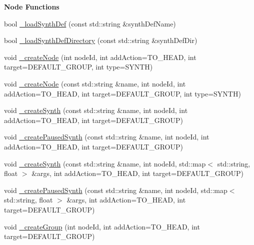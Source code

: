 \begin{Indent}{\bf Node Functions}\par
\begin{DoxyCompactItemize}
\item 
bool \hyperlink{classColliderPlusPlus_1_1Client__Server_ad95270fb115d2fbad727f32130388adf}{\-\_\-load\-Synth\-Def} (const std\-::string \&synth\-Def\-Name)
\item 
bool \hyperlink{classColliderPlusPlus_1_1Client__Server_aba8d4f99041d1b47e1571039c8df7327}{\-\_\-load\-Synth\-Def\-Directory} (const std\-::string \&synth\-Def\-Dir)
\item 
void \hyperlink{classColliderPlusPlus_1_1Client__Server_a8112bffd21ce3d850fc8e1003d58f6d9}{\-\_\-create\-Node} (int node\-Id, int add\-Action=T\-O\-\_\-\-H\-E\-A\-D, int target=D\-E\-F\-A\-U\-L\-T\-\_\-\-G\-R\-O\-U\-P, int type=S\-Y\-N\-T\-H)
\item 
void \hyperlink{classColliderPlusPlus_1_1Client__Server_a6924420f2e0adcfbccdd41c8e8d84ef2}{\-\_\-create\-Node} (const std\-::string \&name, int node\-Id, int add\-Action=T\-O\-\_\-\-H\-E\-A\-D, int target=D\-E\-F\-A\-U\-L\-T\-\_\-\-G\-R\-O\-U\-P, int type=S\-Y\-N\-T\-H)
\item 
void \hyperlink{classColliderPlusPlus_1_1Client__Server_a0ad9d70cad6f9efdc28661c786740c18}{\-\_\-create\-Synth} (const std\-::string \&name, int node\-Id, int add\-Action=T\-O\-\_\-\-H\-E\-A\-D, int target=D\-E\-F\-A\-U\-L\-T\-\_\-\-G\-R\-O\-U\-P)
\item 
void \hyperlink{classColliderPlusPlus_1_1Client__Server_a9748aa2e41f6f439e314584f13a59411}{\-\_\-create\-Paused\-Synth} (const std\-::string \&name, int node\-Id, int add\-Action=T\-O\-\_\-\-H\-E\-A\-D, int target=D\-E\-F\-A\-U\-L\-T\-\_\-\-G\-R\-O\-U\-P)
\item 
void \hyperlink{classColliderPlusPlus_1_1Client__Server_a40d2e779b8abe2ca1f4ef2a36b9d9ad1}{\-\_\-create\-Synth} (const std\-::string \&name, int node\-Id, std\-::map$<$ std\-::string, float $>$ \&args, int add\-Action=T\-O\-\_\-\-H\-E\-A\-D, int target=D\-E\-F\-A\-U\-L\-T\-\_\-\-G\-R\-O\-U\-P)
\item 
void \hyperlink{classColliderPlusPlus_1_1Client__Server_a5e4fb35eb6a72e4bd8391f56faf02dbd}{\-\_\-create\-Paused\-Synth} (const std\-::string \&name, int node\-Id, std\-::map$<$ std\-::string, float $>$ \&args, int add\-Action=T\-O\-\_\-\-H\-E\-A\-D, int target=D\-E\-F\-A\-U\-L\-T\-\_\-\-G\-R\-O\-U\-P)
\item 
void \hyperlink{classColliderPlusPlus_1_1Client__Server_a488b74748594b325e52f5e003c9ca7b8}{\-\_\-create\-Group} (int node\-Id, int add\-Action=T\-O\-\_\-\-H\-E\-A\-D, int target=D\-E\-F\-A\-U\-L\-T\-\_\-\-G\-R\-O\-U\-P)

\end{DoxyCompactItemize}
\end{Indent}
